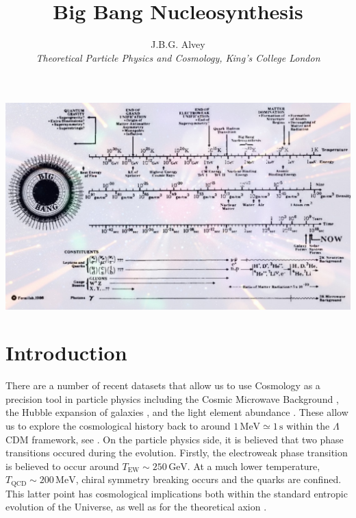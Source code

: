 \documentclass[11pt]{article}
\title{\textbf{Big Bang Nucleosynthesis}}
\author{J.B.G. Alvey \\ \textit{\footnotesize Theoretical Particle Physics and Cosmology, King's College London}}
\date{}
\numberwithin{equation}{section}
\numberwithin{figure}{section}
\numberwithin{table}{section}
\begin{document}
\maketitle
{}
\vspace{100pt}
\begin{center}
\includegraphics[width=\linewidth]{overlay.jpg}
\end{center}
\newpage
\doublespacing
\tableofcontents
{}
\singlespacing
\renewcommand{\thefootnote}{\arabic{footnote}}
\newpage

\section{Introduction}


There are a number of recent datasets that allow us to use Cosmology as a precision tool in particle physics including the Cosmic Microwave Background \citep{Bennett:2003ba}, the Hubble expansion of galaxies \citep{Fukugita:1993hc}, and the light element abundance \citep{Danziger:1970wn}. These allow us to explore the cosmological history back to around $1 \, \textrm{MeV} \simeq 1 \, \textrm{s}$ within the $\Lambda$CDM framework, see \citet{Weinberg:1972kfs}. On the particle physics side, it is believed that two phase transitions occured during the evolution. Firstly, the electroweak phase transition is believed to occur around $T_{\mathrm{EW}} \sim 250 \, \mathrm{GeV}$. At a much lower temperature, $T_{\mathrm{QCD}} \sim 200 \, \mathrm{MeV}$, chiral symmetry breaking occurs and the quarks are confined. This latter point has cosmological implications both within the standard entropic evolution of the Universe, as well as for the theoretical axion \citep{Peccei:1977ur}.
\end{document}
